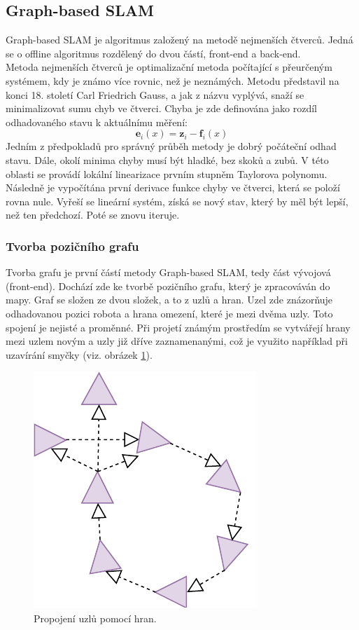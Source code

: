 \documentclass[12pt]{report}
\begin{document}
\newpage

\subsection{Graph-based SLAM}
Graph-based SLAM je algoritmus založený na metodě nejmenších čtverců. Jedná se o offline algoritmus rozdělený do dvou částí, front-end a back-end.\\
\indent Metoda nejmenších čtverců je optimalizační metoda počítající s přeurčeným systémem, kdy je známo více rovnic, než je neznámých. Metodu představil na konci 18. století Carl Friedrich Gauss, a jak z názvu vyplývá, snaží se minimalizovat sumu chyb ve čtverci. Chyba je zde definována jako rozdíl odhadovaného stavu k aktuálnímu měření:
\begin{equation}
	\textbf{e}_i(x)=\textbf{z}_i-\textbf{f}_i(x)
\end{equation}  
Jedním z předpokladů pro správný průběh metody je dobrý počáteční odhad stavu. Dále, okolí minima chyby musí být hladké, bez skoků a zubů. V této oblasti se provádí lokální linearizace prvním stupněm Taylorova polynomu. Následně je vypočítána první derivace funkce chyby ve čtverci, která se položí rovna nule. Vyřeší se lineární systém, získá se nový stav, který by měl být lepší, než ten předchozí. Poté se znovu iteruje.

\subsubsection{Tvorba pozičního grafu}
Tvorba grafu je první částí metody Graph-based SLAM, tedy část vývojová (front-end). Dochází zde ke tvorbě pozičního grafu, který je zpracováván do mapy. Graf se složen ze dvou složek, a to z uzlů a hran. Uzel zde znázorňuje odhadovanou pozici robota a hrana omezení, které je mezi dvěma uzly. Toto spojení je nejisté a proměnné. Při projetí známým prostředím se vytvářejí hrany mezi uzlem novým a uzly již dříve zaznamenanými, což je využito například při uzavírání smyčky (viz. obrázek \ref{fig:GBS_constrains}).\\
\begin{figure}[!ht]
	\begin{center}
		\includegraphics[width=0.4\columnwidth]{imgs/GBS_constrains.pdf}
	\end{center}
	\caption{Propojení uzlů pomocí hran.}
	\label{fig:GBS_constrains}
\end{figure}
\end{document}
